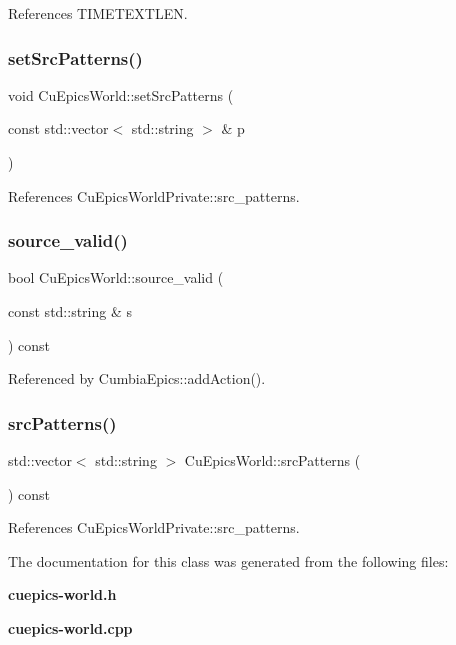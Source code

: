 References T\+I\+M\+E\+T\+E\+X\+T\+L\+EN.

\mbox{\label{classCuEpicsWorld_aeb1f075f1deaffc53098ab74b2f14c14}} 
\subsubsection{set\+Src\+Patterns()}
{\footnotesize\ttfamily void Cu\+Epics\+World\+::set\+Src\+Patterns (\begin{DoxyParamCaption}\item[{const std\+::vector$<$ std\+::string $>$ \&}]{p }\end{DoxyParamCaption})}



References Cu\+Epics\+World\+Private\+::src\+\_\+patterns.

\mbox{\label{classCuEpicsWorld_af94537fdd5cbbd6bed7cfd2fd35777db}} 
\subsubsection{source\+\_\+valid()}
{\footnotesize\ttfamily bool Cu\+Epics\+World\+::source\+\_\+valid (\begin{DoxyParamCaption}\item[{const std\+::string \&}]{s }\end{DoxyParamCaption}) const}



Referenced by Cumbia\+Epics\+::add\+Action().

\mbox{\label{classCuEpicsWorld_ab520509e400ee75726e2b8a7eac58752}} 
\subsubsection{src\+Patterns()}
{\footnotesize\ttfamily std\+::vector$<$ std\+::string $>$ Cu\+Epics\+World\+::src\+Patterns (\begin{DoxyParamCaption}{ }\end{DoxyParamCaption}) const}



References Cu\+Epics\+World\+Private\+::src\+\_\+patterns.



The documentation for this class was generated from the following files\+:\begin{DoxyCompactItemize}
\item 
\textbf{ cuepics-\/world.\+h}\item 
\textbf{ cuepics-\/world.\+cpp}\end{DoxyCompactItemize}
